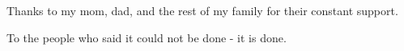 \noindent
Thanks to my mom, dad, and the rest of my family for their constant support. 

To the people who said it could not be done - it is done.

